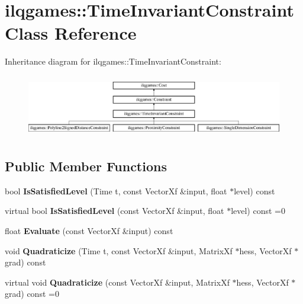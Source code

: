 \hypertarget{classilqgames_1_1_time_invariant_constraint}{}\section{ilqgames\+:\+:Time\+Invariant\+Constraint Class Reference}
\label{classilqgames_1_1_time_invariant_constraint}
Inheritance diagram for ilqgames\+:\+:Time\+Invariant\+Constraint\+:\begin{figure}[H]
\begin{center}
\leavevmode
\includegraphics[height=2.755228cm]{classilqgames_1_1_time_invariant_constraint}
\end{center}
\end{figure}
\subsection*{Public Member Functions}
\begin{DoxyCompactItemize}
\item 
bool {\bfseries Is\+Satisfied\+Level} (Time t, const Vector\+Xf \&input, float $\ast$level) const \hypertarget{classilqgames_1_1_time_invariant_constraint_ab0efa7c3412a2340dcc277db4a869a35}{}\label{classilqgames_1_1_time_invariant_constraint_ab0efa7c3412a2340dcc277db4a869a35}

\item 
virtual bool {\bfseries Is\+Satisfied\+Level} (const Vector\+Xf \&input, float $\ast$level) const =0\hypertarget{classilqgames_1_1_time_invariant_constraint_a8e1a57ae94dc3a9f51c28f146e6c502d}{}\label{classilqgames_1_1_time_invariant_constraint_a8e1a57ae94dc3a9f51c28f146e6c502d}

\item 
float {\bfseries Evaluate} (const Vector\+Xf \&input) const \hypertarget{classilqgames_1_1_time_invariant_constraint_a2e1b3d7fbe55250677bfe61c394dd06f}{}\label{classilqgames_1_1_time_invariant_constraint_a2e1b3d7fbe55250677bfe61c394dd06f}

\item 
void {\bfseries Quadraticize} (Time t, const Vector\+Xf \&input, Matrix\+Xf $\ast$hess, Vector\+Xf $\ast$grad) const \hypertarget{classilqgames_1_1_time_invariant_constraint_ae8244c5a37225511e93a920126df8b7d}{}\label{classilqgames_1_1_time_invariant_constraint_ae8244c5a37225511e93a920126df8b7d}

\item 
virtual void {\bfseries Quadraticize} (const Vector\+Xf \&input, Matrix\+Xf $\ast$hess, Vector\+Xf $\ast$grad) const =0\hypertarget{classilqgames_1_1_time_invariant_constraint_a8ed31ed76064bf2a3a47e9f16be79d88}{}\label{classilqgames_1_1_time_invariant_constraint_a8ed31ed76064bf2a3a47e9f16be79d88}

\end{DoxyCompactItemize}
